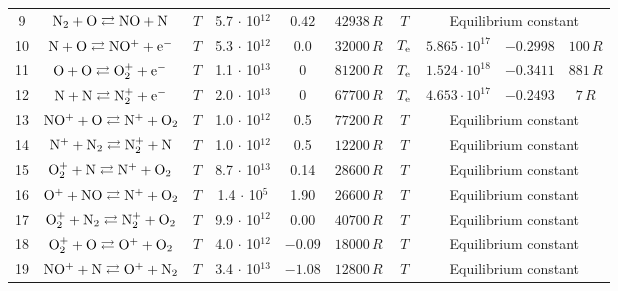 \documentclass{warpdoc}
\begin{document}
\begin{table}[t]
\begin{center}
\begin{threeparttable}
\begin{tabular}{cccccccccc}
9 & $\rm N_2 + O \rightleftarrows NO + N $ & $T$  & 5.7 $\cdot$ 10$^{12}$  & $0.42$ & $42938 \, R$ & $T$ & \multicolumn{3}{c}{Equilibrium constant} \\

10 & $\rm N + O \rightleftarrows NO^+ + e^- $ & $T$  & 5.3 $\cdot$ 10$^{12}$  & 0.0 & $32000 \, R$ & $T_{\rm e}$ & $5.865 \cdot 10^{17}$ & $-0.2998$ & $100 \, R$ \\

11 & $\rm O + O \rightleftarrows O_2^+ + e^- $ & $T$  & 1.1 $\cdot$ 10$^{13}$  & 0 & $81200 \, R$ & $T_{\rm e}$ & $1.524 \cdot 10^{18}$ & $-0.3411$ & $881\, R$\\

12 & $\rm N + N \rightleftarrows N_2^+ + e^- $ & $T$ & 2.0 $\cdot$ 10$^{13}$  & 0 & $67700 \, R$ & $T_{\rm e}$ &  $4.653 \cdot 10^{17}$ & $-0.2493$ & $7\, R$ \\




13 & $\rm NO^+ + O \rightleftarrows N^+ + O_2 $ & $T$   & 1.0 $\cdot$ 10$^{12}$  & 0.5 & $77200 \, R$ & $T$& \multicolumn{3}{c}{Equilibrium constant}\\




14 & $\rm N^+ + N_2 \rightleftarrows N_2^+ + N $ & $T$   & 1.0 $\cdot$ 10$^{12}$  & 0.5 & $12200 \, R$ & $T$ & \multicolumn{3}{c}{Equilibrium constant}\\



15 & $\rm O_2^+ + N \rightleftarrows N^+ + O_2 $ & $T$   & 8.7 $\cdot$ 10$^{13}$  & 0.14 & $28600 \, R$ & $T$ & \multicolumn{3}{c}{Equilibrium constant}\\

16 & $\rm O^+ + NO \rightleftarrows N^+ + O_2 $ & $T$  & 1.4 $\cdot$ 10$^{5}$  & 1.90 & $26600 \, R$ & $T$  & \multicolumn{3}{c}{Equilibrium constant}\\





17 & $\rm O_2^+ + N_2 \rightleftarrows N_2^+ + O_2 $ & $T$   & 9.9 $\cdot$ 10$^{12}$  & 0.00 & $40700 \, R$ & $T$ & \multicolumn{3}{c}{Equilibrium constant}\\

18 & $\rm O_2^+ + O \rightleftarrows O^+ + O_2 $ & $T$   & 4.0 $\cdot$ 10$^{12}$  & $-0.09$ & $18000 \, R$ & $T$ & \multicolumn{3}{c}{Equilibrium constant}\\

19 & $\rm NO^+ + N \rightleftarrows O^+ + N_2 $ & $T$   & 3.4 $\cdot$ 10$^{13}$  & $-1.08$ & $12800 \, R$ & $T$ & \multicolumn{3}{c}{Equilibrium constant}\\


\end{tabular}
\end{threeparttable}
\end{center}
\end{table}
\end{document}
